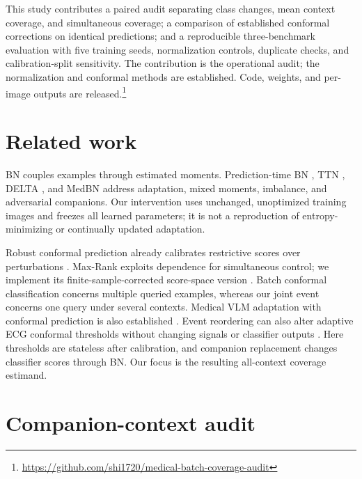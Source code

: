 \documentclass{article}
\begin{document}
This study contributes a paired audit separating class changes, mean context coverage, and simultaneous coverage; a comparison of established conformal corrections on identical predictions; and a reproducible three-benchmark evaluation with five training seeds, normalization controls, duplicate checks, and calibration-split sensitivity. The contribution is the operational audit; the normalization and conformal methods are established. Code, weights, and per-image outputs are released.\footnote{\url{https://github.com/shi1720/medical-batch-coverage-audit}}

\section{Related work}
BN \cite{bn} couples examples through estimated moments. Prediction-time BN \cite{nado}, TTN \cite{ttn}, DELTA \cite{delta}, and MedBN \cite{medbn} address adaptation, mixed moments, imbalance, and adversarial companions. Our intervention uses unchanged, unoptimized training images and freezes all learned parameters; it is not a reproduction of entropy-minimizing or continually updated adaptation.

Robust conformal prediction already calibrates restrictive scores over perturbations \cite{massena}. Max-Rank \cite{maxrank} exploits dependence for simultaneous control; we implement its finite-sample-corrected score-space version \cite{corrected}. Batch conformal classification \cite{gazin} concerns multiple queried examples, whereas our joint event concerns one query under several contexts. Medical VLM adaptation with conformal prediction is also established \cite{scpt,lata}. Event reordering can also alter adaptive ECG conformal thresholds without changing signals or classifier outputs \cite{conformalshift}. Here thresholds are stateless after calibration, and companion replacement changes classifier scores through BN. Our focus is the resulting all-context coverage estimand.

\section{Companion-context audit}
\end{document}
